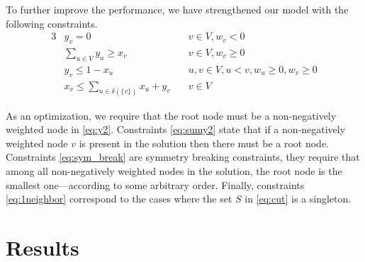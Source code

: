 
		To further improve the performance, we have strengthened our model with the
		following constraints.
		\begin{alignat}{3}
		\label{eq:y2}   & y_v = 0 & v \in V, w_v < 0\\
		\label{eq:sumy2} & \sum_{u \in V} y_u \geq x_v & v \in V, w_v\geq 0\\
		\label{eq:sym_break} & y_v \leq 1 - x_u \quad & u, v \in V, u < v, w_u \geq 0, w_v \geq 0\\
		\label{eq:1neighbor} & x_v \leq \sum_{u \in \delta(\{v\})} x_u + y_v \quad & v \in V
		\end{alignat}

		As an optimization, we require that the root node must be a non-negatively
		weighted node in \eqref{eq:y2}.
		Constraints \eqref{eq:sumy2} state that if a non-negatively weighted node $v$ is
		present in the solution then there must be a root node. Constraints
		\eqref{eq:sym_break} are symmetry breaking constraints, they require that among
		all non-negatively weighted nodes in the solution, the root node is the smallest
		one---according to some arbitrary order. Finally, constraints
		\eqref{eq:1neighbor} correspond to the cases where the set $S$ in \eqref{eq:cut}
		is a singleton.

\section{Results}
\label{sec:xhres}
